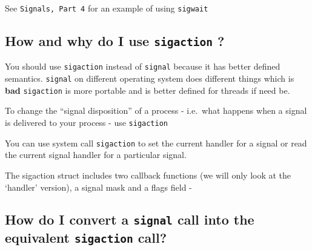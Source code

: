 See \texttt{Signals,\ Part\ 4} for an example of using \texttt{sigwait}

\subsection{\texorpdfstring{How and why do I use \texttt{sigaction}
?}{How and why do I use sigaction ?}}\label{how-and-why-do-i-use-sigaction}

You should use \texttt{sigaction} instead of \texttt{signal} because it
has better defined semantics. \texttt{signal} on different operating
system does different things which is \textbf{bad} \texttt{sigaction} is
more portable and is better defined for threads if need be.

To change the ``signal disposition'' of a process - i.e.~what happens
when a signal is delivered to your process - use \texttt{sigaction}

You can use system call \texttt{sigaction} to set the current handler
for a signal or read the current signal handler for a particular signal.

\begin{Shaded}
\begin{Highlighting}[]
     
\end{Highlighting}
\end{Shaded}

The sigaction struct includes two callback functions (we will only look
at the `handler' version), a signal mask and a flags field -

\begin{Shaded}
\begin{Highlighting}[]
 
                    \NormalTok{);}
                     \NormalTok{*);}
                       
\NormalTok{\}; }
\end{Highlighting}
\end{Shaded}

\subsection{\texorpdfstring{How do I convert a \texttt{signal} call into
the equivalent \texttt{sigaction}
call?}{How do I convert a signal call into the equivalent sigaction call?}}\label{how-do-i-convert-a-signal-call-into-the-equivalent-sigaction-call}

